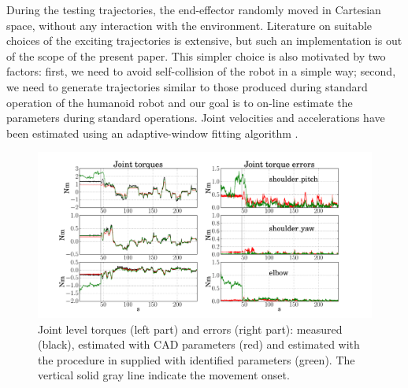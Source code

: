 During the testing trajectories, the end-effector randomly moved in Cartesian space, without any interaction with the environment. Literature on suitable choices of the exciting trajectories is extensive, but such an implementation is out of the scope of the present paper. This simpler choice is also motivated by two factors: first, we need to avoid self-collision of the robot in a simple way; second, we need to generate trajectories similar to those produced during standard operation of the humanoid robot and our goal is to on-line estimate the parameters during standard operations. Joint velocities and accelerations have been estimated using an adaptive-window fitting algorithm \cite{aw2000}. 

%
%

\begin{figure}
 \centering
 \includegraphics[width=1.0\textwidth]{images/torque_estimation.pdf}
 \caption{Joint level torques (left part) and errors (right part): measured (black), estimated with CAD parameters (red) and estimated with the procedure in \cite{Fumagalli2012} supplied with identified parameters (green). The vertical solid gray line indicate the movement onset.}
 \label{fig:torqueEstimation}
\end{figure}

